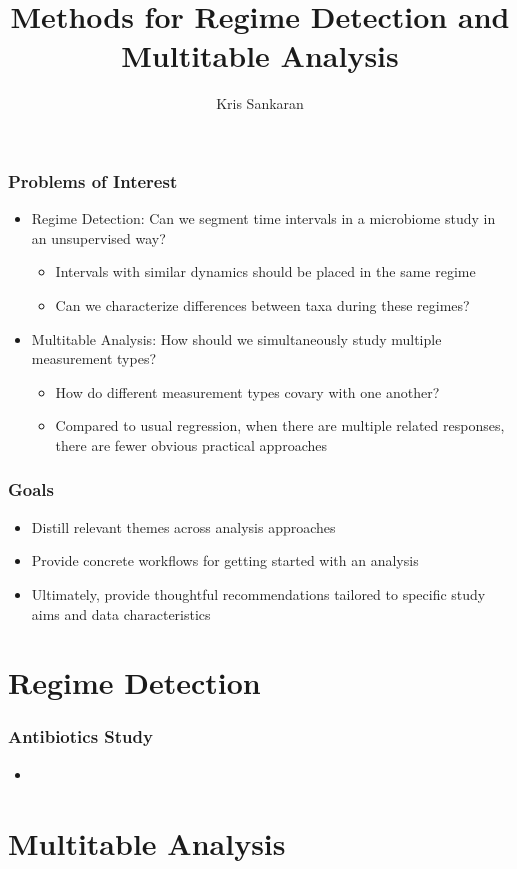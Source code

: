 \documentclass{beamer}
\title{Methods for Regime Detection and Multitable Analysis}
\author{Kris Sankaran}
\begin{document}
\begin{frame}
  \frametitle{Problems of Interest}
 \begin{itemize}
 \item Regime Detection: Can we segment time intervals in a microbiome study in
   an unsupervised way?
   \begin{itemize}
   \item Intervals with similar dynamics should be placed in the same regime
   \item Can we characterize differences between taxa during these regimes?
   \end{itemize}
 \item Multitable Analysis: How should we simultaneously study multiple
   measurement types?
   \begin{itemize}
   \item How do different measurement types covary with one another?
   \item Compared to usual regression, when there are multiple related
     responses, there are fewer obvious practical approaches
   \end{itemize}
 \end{itemize} 
\end{frame}

\begin{frame}
  \frametitle{Goals}
  \begin{itemize}
  \item Distill relevant themes across analysis approaches
  \item Provide concrete workflows for getting started with an analysis
  \item Ultimately, provide thoughtful recommendations tailored to specific
    study aims and data characteristics
  \end{itemize} 
\end{frame}

\section{Regime Detection}
\label{sec:regime_detection}

\begin{frame}
  \frametitle{Antibiotics Study}
 \begin{itemize}
 \item 
 \end{itemize} 
\end{frame}

\section{Multitable Analysis}
\label{sec:multitable analysis}
\end{document}
